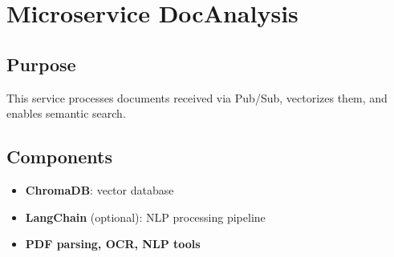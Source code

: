 \chapter{Microservice DocAnalysis}

\section{Purpose}
This service processes documents received via Pub/Sub, vectorizes them, and enables semantic search.

\section{Components}
\begin{itemize}
    \item \textbf{ChromaDB}: vector database
    \item \textbf{LangChain} (optional): NLP processing pipeline
    \item \textbf{PDF parsing, OCR, NLP tools}
\end{itemize}